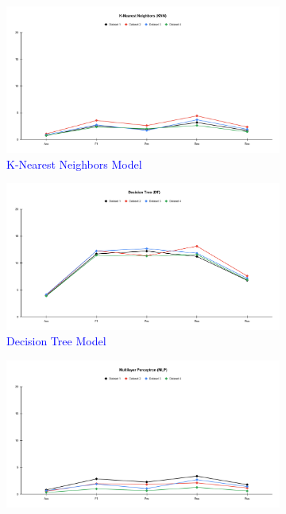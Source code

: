 \documentclass[a4paper,fleqn]{cas-dc}
\newcommand{\responsemodsm}[1]{\textcolor{blue}{#1}}
\newcommand{\captionb}[1]{\caption{\responsemodsm{#1}}}
\begin{document}
\begin{figure}[H]
    \raggedright
    \begin{subfigure}{\columnwidth}
        \includegraphics[width=0.9\columnwidth]{delta_KNN.pdf}
        \captionb{K-Nearest Neighbors Model}\label{fig:performance_delta_knn}
    \end{subfigure}
    \begin{subfigure}{\columnwidth}
        \includegraphics[width=0.9\columnwidth]{delta_DT.pdf}
        \captionb{Decision Tree Model}\label{fig:performance_delta_dt}
    \end{subfigure}
    \begin{subfigure}{\columnwidth}
        \includegraphics[width=0.9\columnwidth]{delta_MLP.pdf}

\end{subfigure}
\end{figure}
\end{document}
